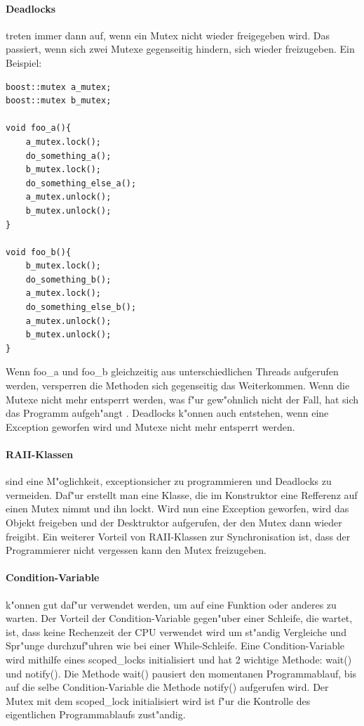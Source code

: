 \documentclass[14pt, a4paper]{report}
\begin{document}
\paragraph{Deadlocks} treten immer dann auf, wenn ein Mutex nicht wieder freigegeben 
wird. Das passiert, wenn sich zwei Mutexe gegenseitig hindern, sich wieder 
freizugeben. Ein Beispiel:
\begin{lstlisting}
boost::mutex a_mutex;
boost::mutex b_mutex;

void foo_a(){
	a_mutex.lock();
	do_something_a();
	b_mutex.lock();
	do_something_else_a();
	a_mutex.unlock();
	b_mutex.unlock();
}

void foo_b(){
	b_mutex.lock();
	do_something_b();
	a_mutex.lock();
	do_something_else_b();
	a_mutex.unlock();
	b_mutex.unlock();
}
\end{lstlisting}
Wenn foo\_a und foo\_b gleichzeitig aus unterschiedlichen Threads aufgerufen werden, 
versperren die Methoden sich gegenseitig das Weiterkommen. Wenn die Mutexe nicht mehr
entsperrt werden, was f"ur gew"ohnlich nicht der Fall, hat sich das Programm
\glqq aufgeh"angt \grqq. Deadlocks k"onnen auch entstehen, wenn eine Exception geworfen wird und
Mutexe nicht mehr entsperrt werden.

\paragraph{RAII-Klassen} sind eine M"oglichkeit, exceptionsicher zu programmieren und 
Deadlocks zu vermeiden. Daf"ur erstellt man eine Klasse, die im Konstruktor eine 
Refferenz auf einen Mutex nimmt und ihn lockt. Wird nun eine Exception geworfen, wird
das Objekt freigeben und der Desktruktor aufgerufen, der den Mutex dann wieder freigibt.
Ein weiterer Vorteil von RAII-Klassen zur Synchronisation ist, dass der Programmierer 
nicht vergessen kann den Mutex freizugeben.

\paragraph{Condition-Variable} k"onnen gut daf"ur verwendet werden, um auf eine Funktion
oder anderes zu warten. Der Vorteil der Condition-Variable gegen"uber einer Schleife,
die wartet, ist, dass keine Rechenzeit der CPU verwendet wird um st"andig Vergleiche und
Spr"unge durchzuf"uhren wie bei einer While-Schleife. 
Eine Condition-Variable wird mithilfe eines scoped\_locks
initialisiert und hat 2 wichtige Methode: wait() und notify(). Die Methode wait() 
pausiert den momentanen Programmablauf, bis auf die selbe Condition-Variable die Methode
notify() aufgerufen wird. Der Mutex mit dem scoped\_lock initialisiert wird ist f"ur die
Kontrolle des eigentlichen Programmablaufs zust"andig.
\end{document}
